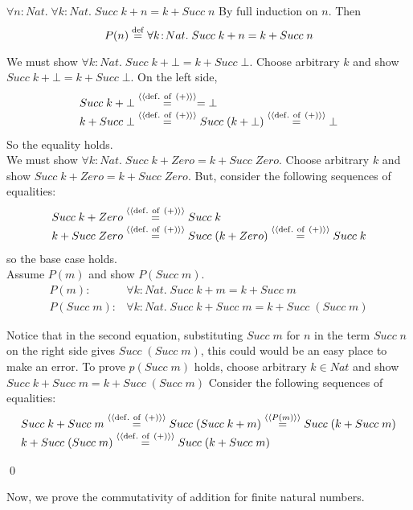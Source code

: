 \documentclass[11pt]{article}
\newcommand{\s}{{Succ\;}}
\begin{document}
\newpage

\begin{lemma}
\label{lemma2}
$\forall{}n:Nat.\;\forall{}k:Nat.\; \s k + n = k + \s n$ \Proof By full
induction on $n$. Then \[P(n)\definedAs \forall{}k\!:\!Nat.\; \s k + n = k + \s
n \]

\CASE[$P(\bot)$] We must show $\forall{}k\!:\!Nat.\; \s k + \bot = k + \s \bot$.
Choose arbitrary $k$ and show $\s k + \bot = k + \s \bot$.  On the left side,
\[\begin{array}{l}
\s k + \bot \byDef{(+)}= \bot\\
k+\s\bot \byDef{(+)} \s(k+\bot) \byDef{(+)}\bot
\end{array}\]
So the equality holds. \\

\CASE[$P(Zero)$] We must show $\forall{}k\!:\!Nat.\; \s k + Zero = k + \s Zero $. Choose arbitrary $k$ and show $\s k + Zero = k + \s Zero$.  But, consider the following sequences of equalities:
\[\begin{array}{l}
\s k + Zero \byDef{(+)} \s k \\
k + \s Zero \byDef{(+)} \s (k+ Zero) \byDef{(+)} \s k
\end{array}\]
so the base case holds.\\

\CASE[$P(\s m)$] Assume $P(m)$ and show $P(\s m)$.
\[\begin{array}{rl}
P(m) :& \forall{}k\!:\!Nat.\; \s k + m = k + \s m \\
P(\s m):&  \forall{}k\!:\!Nat.\; \s k + \s m = k + \s (\s m) 
\end{array}\]

Notice that in the second equation, substituting $\s m$ for $n$ in the term $\s
n$ on the right side gives $\s (\s m)$, this could would be an easy place to
make an error. To prove $p(\s m)$ holds, choose arbitrary $k\in{}Nat$ and show
$\s k + \s m = k + \s (\s m) $ Consider the following sequences of equalities:
\[\begin{array}{l}
\s k + \s m \byDef{(+)} \s(\s k + m) \byEq{P(m)} \s(k + \s m)\\ 
k + \s (\s m)  \byDef{(+)} \s(k + \s m)
\end{array}\]



\qed
\end{lemma}

Now, we prove the commutativity of addition for finite natural numbers.
\end{document}
